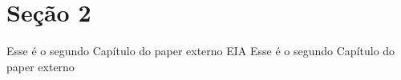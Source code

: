 \section{Seção 2}\label{sec:extern2}
Esse é o segundo Capítulo do paper externo
\gls{EIA}\cite{ciccozziBIMBEMBuilding2023}
Esse é o segundo Capítulo do paper externo
